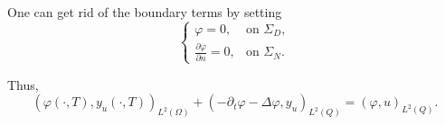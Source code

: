 \documentclass[12pt,a4paper]{article}
\theoremstyle{plain}
\theoremstyle{definition}
\begin{document}
One can get rid of the boundary terms by setting
%
\begin{equation} \label{eq:heatOptAdjointBC}
\begin{cases}
\varphi = 0, & \text{on } \Sigma_D, \\
\displaystyle \frac{\partial \varphi}{\partial n} = 0, & \text{on } \Sigma_N.
\end{cases}
\end{equation}

Thus,
%
\begin{equation} \label{eq:heatOptAdjoint}
\left( \varphi \left( \cdot, T \right), y_u \left( \cdot, T \right) \right)_{L^2 \left( \Omega \right)} + \left( -\partial_t \varphi - \Delta \varphi, y_u \right)_{L^2\left( Q \right)} = \left( \varphi, u \right)_{L^2\left( Q \right)}.
\end{equation}
\end{document}
